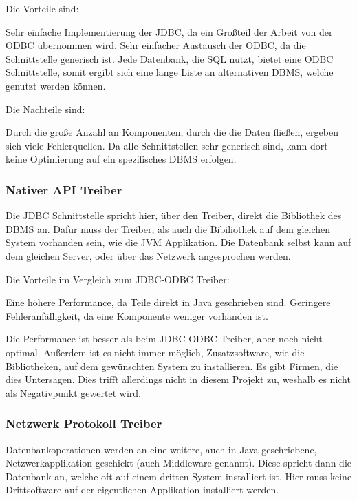 Die Vorteile sind:

\begin{outline}
  \1 Sehr einfache Implementierung der JDBC, da ein Großteil der Arbeit von
  der ODBC übernommen wird.
  \1 Sehr einfacher Austausch der ODBC, da die Schnittstelle generisch ist.
  \1 Jede Datenbank, die SQL nutzt, bietet eine ODBC Schnittstelle, somit
  ergibt sich eine lange Liste an alternativen DBMS, welche genutzt werden
  können.
\end{outline}

Die Nachteile sind:

\begin{outline}
  \1 Durch die große Anzahl an Komponenten, durch die die Daten fließen,
  ergeben sich viele Fehlerquellen.
  \1 Da alle Schnittstellen sehr generisch sind, kann dort keine Optimierung
  auf ein spezifisches DBMS erfolgen.
\end{outline}

\subsubsection{Nativer API Treiber}
Die JDBC Schnittstelle spricht hier, über den Treiber, direkt die Bibliothek
des DBMS an. Dafür muss der Treiber, als auch die Bibiliothek auf dem gleichen
System vorhanden sein, wie die JVM Applikation. Die Datenbank selbst kann auf
dem gleichen Server, oder über das Netzwerk angesprochen werden.

Die Vorteile im Vergleich zum JDBC-ODBC Treiber:
\begin{outline}
  \1 Eine höhere Performance, da Teile direkt in Java geschrieben sind.
  \1 Geringere Fehleranfälligkeit, da eine Komponente weniger vorhanden ist.
\end{outline}

Die Performance ist besser als beim JDBC-ODBC Treiber, aber noch nicht optimal.
Außerdem ist es nicht immer möglich, Zusatzsoftware, wie die Bibliotheken, auf
dem gewünschten System zu installieren. Es gibt Firmen, die dies Untersagen.
Dies trifft allerdings nicht in diesem Projekt zu, weshalb es nicht als
Negativpunkt gewertet wird.

\subsubsection{Netzwerk Protokoll Treiber}
Datenbankoperationen werden an eine weitere, auch in Java geschriebene,
Netzwerkapplikation geschickt (auch \gls{Middleware} genannt). Diese spricht
dann die Datenbank an, welche oft auf einem dritten System installiert ist.
Hier muss keine Drittsoftware auf der eigentlichen Applikation installiert
werden.

